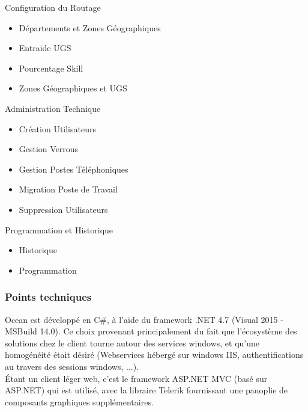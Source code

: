 \documentclass{rapport}
\begin{document}
\begin{itemize}
\begin{minipage}{0.5\textwidth}
    \item Configuration du Routage
        \begin{itemize}
        \item Départements et Zones Géographiques
        \item Entraide UGS
        \item Pourcentage Skill
        \item Zones Géographiques et UGS
        \end{itemize}
    \vspace{5mm} %
    \item Administration Technique
        \begin{itemize}
        \item Création Utilisateurs
        \item Gestion Verrous
        \item Gestion Postes Téléphoniques
        \item Migration Poste de Travail
        \item Suppression Utilisateurs
        \end{itemize}
    \vspace{5mm} %
    \item Programmation et Historique
        \begin{itemize}
        \item Historique
        \item Programmation
        \end{itemize}
\end{minipage}
\end{itemize}


\subsubsection{Points techniques}

Ocean est développé en C\#, à l'aide du framework .NET 4.7 (Visual 2015 - MSBuild 14.0). Ce choix provenant principalement du fait que l'écosystème des solutions chez le client tourne autour des services windows, et qu'une homogénéité était désiré (Webservices hébergé sur windows IIS, authentifications au travers des sessions windows, ...).\\
Étant un client léger web, c'est le framework ASP.NET MVC (basé sur ASP.NET) qui est utilisé, avec la libraire Telerik fournissant une panoplie de composants graphiques supplémentaires.\\
\end{document}
